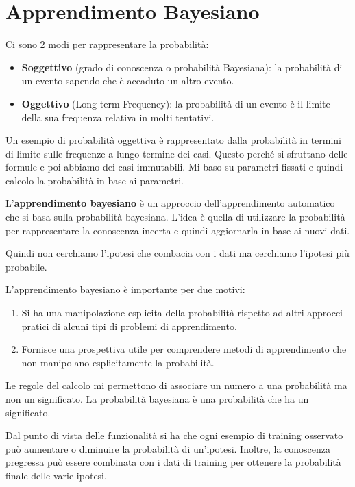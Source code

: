 \chapter{Apprendimento Bayesiano}
Ci sono 2 modi per rappresentare la probabilità:
\begin{itemize}
    \item \textbf{Soggettivo} (grado di conoscenza o probabilità Bayesiana): la
          probabilità di un evento sapendo che è accaduto un altro evento.
    \item \textbf{Oggettivo} (Long-term Frequency): la probabilità di un evento
          è il limite della sua frequenza relativa in molti tentativi.
\end{itemize}
Un esempio di probabilità oggettiva è rappresentato dalla probabilità in termini
di limite sulle frequenze a lungo termine dei casi. Questo perché si sfruttano
delle formule e poi abbiamo dei casi immutabili. Mi baso su parametri fissati e
quindi calcolo la probabilità in base ai parametri.

L'\textbf{apprendimento bayesiano} è un approccio dell'apprendimento automatico
che si basa sulla probabilità bayesiana. L'idea è quella di utilizzare la
probabilità per rappresentare la conoscenza incerta e quindi aggiornarla in base
ai nuovi dati.
\begin{center}
    Quindi non cerchiamo l'ipotesi che combacia con i dati ma cerchiamo l'ipotesi
    più probabile.
\end{center}

L'apprendimento bayesiano è importante per due motivi:
\begin{enumerate}
    \item Si ha una manipolazione esplicita della probabilità rispetto ad altri
          approcci pratici di alcuni tipi di problemi di apprendimento.
    \item Fornisce una prospettiva utile per comprendere metodi di apprendimento
          che non manipolano esplicitamente la probabilità.
\end{enumerate}
Le regole del calcolo mi permettono di associare un numero a una probabilità ma
non un significato. La probabilità bayesiana è una probabilità che ha un significato.

Dal punto di vista delle funzionalità si ha che ogni esempio di training osservato
può aumentare o diminuire la probabilità di un'ipotesi. Inoltre, la conoscenza
pregressa può essere combinata con i dati di training per ottenere la probabilità
finale delle varie ipotesi.

